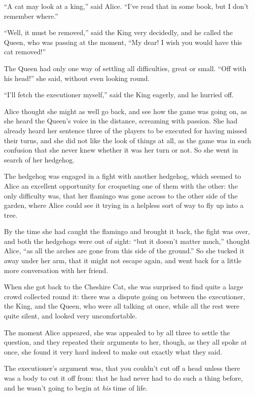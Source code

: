\documentclass[book, 20pt]{extbook}
\begin{document}
``A cat may look at a king,'' said Alice. ``I've read that in some book,
but I don't remember where.''

``Well, it must be removed,'' said the King very decidedly, and he
called the Queen, who was passing at the moment, ``My dear! I wish you
would have this cat removed!''

The Queen had only one way of settling all difficulties, great or small.
``Off with his head!'' she said, without even looking round.

``I'll fetch the executioner myself,'' said the King eagerly, and he
hurried off.

Alice thought she might as well go back, and see how the game was going
on, as she heard the Queen's voice in the distance, screaming with
passion. She had already heard her sentence three of the players to be
executed for having missed their turns, and she did not like the look of
things at all, as the game was in such confusion that she never knew
whether it was her turn or not. So she went in search of her hedgehog.

The hedgehog was engaged in a fight with another hedgehog, which seemed
to Alice an excellent opportunity for croqueting one of them with the
other: the only difficulty was, that her flamingo was gone across to the
other side of the garden, where Alice could see it trying in a helpless
sort of way to fly up into a tree.

By the time she had caught the flamingo and brought it back, the fight
was over, and both the hedgehogs were out of sight: ``but it doesn't
matter much,'' thought Alice, ``as all the arches are gone from this
side of the ground.'' So she tucked it away under her arm, that it might
not escape again, and went back for a little more conversation with her
friend.

When she got back to the Cheshire Cat, she was surprised to find quite a
large crowd collected round it: there was a dispute going on between the
executioner, the King, and the Queen, who were all talking at once,
while all the rest were quite silent, and looked very uncomfortable.

The moment Alice appeared, she was appealed to by all three to settle
the question, and they repeated their arguments to her, though, as they
all spoke at once, she found it very hard indeed to make out exactly
what they said.

The executioner's argument was, that you couldn't cut off a head unless
there was a body to cut it off from: that he had never had to do such a
thing before, and he wasn't going to begin at \emph{his} time of life.
\end{document}
